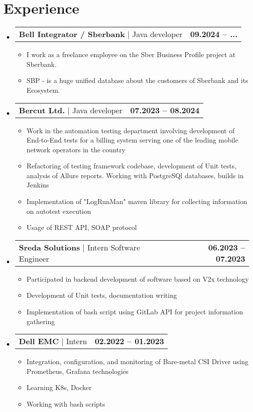 \documentclass[a4paper,9pt]{report}
\makeatletter
\newcommand{\lineSeparatedText}[2]{
        {\textbf{\normalsize{{#1}}}} $|$ {\large{#2}}
}
\newcommand{\resumeExpItem}[2] {
    \item
    \begin{tabular*}{1.001\textwidth}{l@{\extracolsep{\fill}}r}
        #1 & \textbf{\small#2}
    \end{tabular*}\vspace{-5pt}
}
\newcommand{\resumeSubHeadingListStart}{\begin{itemize}[leftmargin=0.0in, label={}]}
\newcommand{\resumeSubHeadingListEnd}{\end{itemize}}
\newcommand{\resumeItemListStart}{\begin{itemize}}
\newcommand{\resumeItemListEnd}{\end{itemize}\vspace{-5pt}}
\newcommand{\bulletItem}[1]{\item[$\bullet$] #1}
\makeatother
\begin{document}
\section{Experience}
\resumeSubHeadingListStart

\resumeExpItem {\lineSeparatedText{Bell Integrator / Sberbank}{Java developer}}{09.2024 -- ...}
\resumeItemListStart
\bulletItem{I work as a freelance employee on the Sber Business Profile project at Sberbank.}
\bulletItem{SBP - is a huge unified database about the customers of Sberbank and its Ecosystem.}
\resumeItemListEnd

\resumeExpItem {\lineSeparatedText{Bercut Ltd.}{Java developer}}{07.2023 -- 08.2024}
\resumeItemListStart
\bulletItem{Work in the automation testing department involving development of End-to-End tests for a billing system serving one of the leading mobile network operators in the country}
\bulletItem{Refactoring of testing framework codebase, development of Unit tests, analysis of Allure reports. Working with PostgreSQl databases, builds in Jenkins}
\bulletItem{Implementation of "LogRunMan" maven library for collecting information on autotest execution}
\bulletItem{Usage of REST API, SOAP protocol}
\resumeItemListEnd

\resumeExpItem {\lineSeparatedText{Sreda Solutions}{Intern Software Engineer}}{06.2023 -- 07.2023}
\resumeItemListStart
\bulletItem{Participated in backend development of software based on V2x technology}
\bulletItem{Development of Unit tests, documentation writing}
\bulletItem{Implementation of bash script using GitLab API for project information gathering}
\resumeItemListEnd

\resumeExpItem {\lineSeparatedText{Dell EMC}{Intern}}{02.2022 -- 01.2023}
\resumeItemListStart
\bulletItem{Integration, configuration, and monitoring of Bare-metal CSI Driver using Prometheus, Grafana technologies}
\bulletItem{Learning K8s, Docker}
\bulletItem{Working with bash scripts}
\resumeItemListEnd


\resumeSubHeadingListEnd

\vspace{-10pt}
\end{document}
